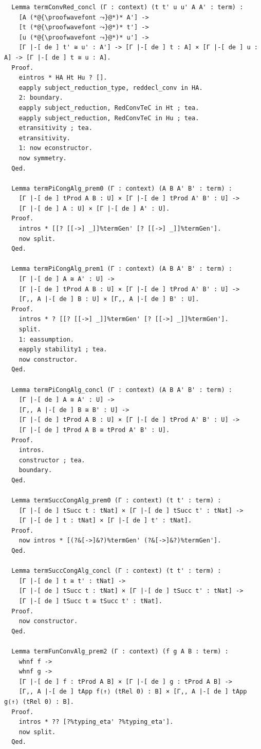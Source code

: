 \documentclass[10pt,a4paper]{amsart}
\begin{document}
\begin{lstlisting}
  Lemma termConvRed_concl (Γ : context) (t t' u u' A A' : term) :
    [A (*@{\proofwavefont ⤳}@*)* A'] ->
    [t (*@{\proofwavefont ⤳}@*)* t'] ->
    [u (*@{\proofwavefont ⤳}@*)* u'] ->
    [Γ |-[ de ] t' ≅ u' : A'] -> [Γ |-[ de ] t : A] × [Γ |-[ de ] u : A] -> [Γ |-[ de ] t ≅ u : A].
  Proof.
    eintros * HA Ht Hu ? [].
    eapply subject_reduction_type, reddecl_conv in HA.
    2: boundary.
    eapply subject_reduction, RedConvTeC in Ht ; tea.
    eapply subject_reduction, RedConvTeC in Hu ; tea.
    etransitivity ; tea.
    etransitivity.
    1: now econstructor.
    now symmetry.
  Qed.

  Lemma termPiCongAlg_prem0 (Γ : context) (A B A' B' : term) :
    [Γ |-[ de ] tProd A B : U] × [Γ |-[ de ] tProd A' B' : U] ->
    [Γ |-[ de ] A : U] × [Γ |-[ de ] A' : U].
  Proof.
    intros * [[? [[->] _]]%termGen' [? [[->] _]]%termGen'].
    now split.
  Qed.

  Lemma termPiCongAlg_prem1 (Γ : context) (A B A' B' : term) :
    [Γ |-[ de ] A ≅ A' : U] ->
    [Γ |-[ de ] tProd A B : U] × [Γ |-[ de ] tProd A' B' : U] ->
    [Γ,, A |-[ de ] B : U] × [Γ,, A |-[ de ] B' : U].
  Proof.
    intros * ? [[? [[->] _]]%termGen' [? [[->] _]]%termGen'].
    split.
    1: eassumption.
    eapply stability1 ; tea.
    now constructor.
  Qed.

  Lemma termPiCongAlg_concl (Γ : context) (A B A' B' : term) :
    [Γ |-[ de ] A ≅ A' : U] ->
    [Γ,, A |-[ de ] B ≅ B' : U] ->
    [Γ |-[ de ] tProd A B : U] × [Γ |-[ de ] tProd A' B' : U] ->
    [Γ |-[ de ] tProd A B ≅ tProd A' B' : U].
  Proof.
    intros.
    constructor ; tea.
    boundary.
  Qed.

  Lemma termSuccCongAlg_prem0 (Γ : context) (t t' : term) :
    [Γ |-[ de ] tSucc t : tNat] × [Γ |-[ de ] tSucc t' : tNat] ->
    [Γ |-[ de ] t : tNat] × [Γ |-[ de ] t' : tNat].
  Proof.
    now intros * [(?&[->]&?)%termGen' (?&[->]&?)%termGen'].
  Qed.
  
  Lemma termSuccCongAlg_concl (Γ : context) (t t' : term) :
    [Γ |-[ de ] t ≅ t' : tNat] ->
    [Γ |-[ de ] tSucc t : tNat] × [Γ |-[ de ] tSucc t' : tNat] ->
    [Γ |-[ de ] tSucc t ≅ tSucc t' : tNat].
  Proof.
    now constructor.
  Qed.

  Lemma termFunConvAlg_prem2 (Γ : context) (f g A B : term) :
    whnf f ->
    whnf g ->
    [Γ |-[ de ] f : tProd A B] × [Γ |-[ de ] g : tProd A B] ->
    [Γ,, A |-[ de ] tApp f⟨↑⟩ (tRel 0) : B] × [Γ,, A |-[ de ] tApp g⟨↑⟩ (tRel 0) : B].
  Proof.
    intros * ?? [?%typing_eta' ?%typing_eta'].
    now split.
  Qed.


\end{lstlisting}
\end{document}

